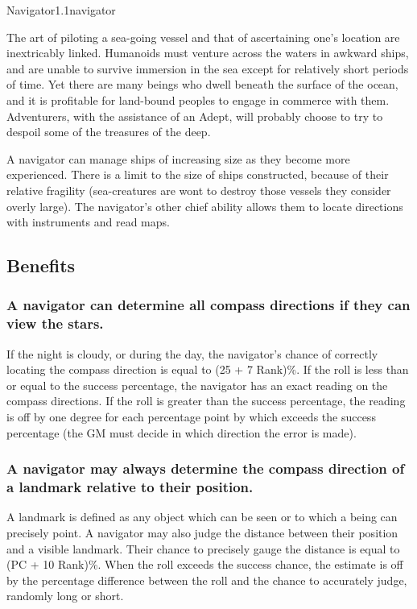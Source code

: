 \begin{skill}{Navigator}{1.1}{navigator}

The art of piloting a sea-going vessel and that of ascertaining one's
location are inextricably linked.  Humanoids must venture across the
waters in awkward ships, and are unable to survive immersion in the
sea except for relatively short periods of time.  Yet there are many
beings who dwell beneath the surface of the ocean, and it is
profitable for land-bound peoples to engage in commerce with them.
Adventurers, with the assistance of an Adept, will probably choose to
try to despoil some of the treasures of the deep.

A navigator can manage ships of increasing size as they become
more experienced. There is a limit to the size of ships constructed,
because of their relative fragility (sea-creatures are wont to destroy
those vessels they consider overly large).  The navigator's other
chief ability allows them to locate directions with instruments and
read maps.


\subsection{Benefits}

\subsubsection{A navigator can determine all compass directions if they
can view the stars.}

If the night is cloudy, or during the day, the navigator's chance of
correctly locating the compass direction is equal to (25 + 7 \x
Rank)\%. If the roll is less than or equal to the success percentage,
the navigator has an exact reading on the compass directions.  If the
roll is greater than the success percentage, the reading is off by one
degree for each percentage point by which exceeds the success
percentage (the GM must decide in which direction the error is made).

\subsubsection{A navigator may always determine the compass direction
of a landmark relative to their position.}

A landmark is defined as any object which can be seen or to which a
being can precisely point.  A navigator may also judge the distance
between their position and a visible landmark. Their chance to
precisely gauge the distance is equal to (PC + 10 \x Rank)\%. When the
roll exceeds the success chance, the estimate is off by the percentage
difference between the roll and the chance to accurately judge,
randomly long or short.


\end{skill}
